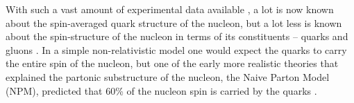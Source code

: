 With such a vast amount of experimental data available%
, a lot is now known about the spin-averaged quark structure of the nucleon, but a lot less is known about the spin-structure of the nucleon in terms of its constituents – quarks and gluons \cite{KuhnHUGS}. In a simple non-relativistic model one would expect the quarks to carry the entire spin of the nucleon, but one of the early more %
realistic theories that explained the partonic substructure of the nucleon, the Naive %
Parton Model (NPM), predicted that 60\% of the nucleon spin is carried by the quarks \cite{vipuliTh}. %

